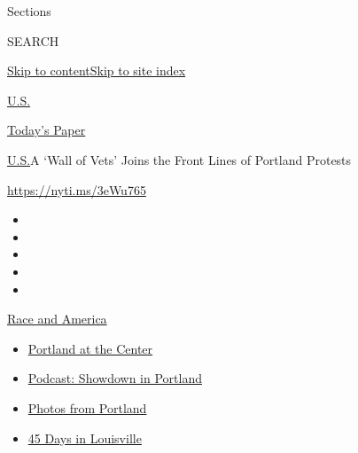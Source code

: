 Sections

SEARCH

\protect\hyperlink{site-content}{Skip to
content}\protect\hyperlink{site-index}{Skip to site index}

\href{https://www.nytimes3xbfgragh.onion/section/us}{U.S.}

\href{https://myaccount.nytimes3xbfgragh.onion/auth/login?response_type=cookie\&client_id=vi}{}

\href{https://www.nytimes3xbfgragh.onion/section/todayspaper}{Today's
Paper}

\href{/section/us}{U.S.}\textbar{}A `Wall of Vets' Joins the Front Lines
of Portland Protests

\url{https://nyti.ms/3eWu765}

\begin{itemize}
\item
\item
\item
\item
\item
\end{itemize}

\href{https://www.nytimes3xbfgragh.onion/news-event/george-floyd-protests-minneapolis-new-york-los-angeles?action=click\&pgtype=Article\&state=default\&module=styln-george-floyd\&region=TOP_BANNER\&context=storylines_menu}{Race
and America}

\begin{itemize}
\tightlist
\item
  \href{https://www.nytimes3xbfgragh.onion/2020/07/24/us/portland-oregon-protests-white-race.html?action=click\&pgtype=Article\&state=default\&module=styln-george-floyd\&region=TOP_BANNER\&context=storylines_menu}{Portland
  at the Center}
\item
  \href{https://www.nytimes3xbfgragh.onion/2020/07/23/podcasts/the-daily/portland-protests.html?action=click\&pgtype=Article\&state=default\&module=styln-george-floyd\&region=TOP_BANNER\&context=storylines_menu}{Podcast:
  Showdown in Portland}
\item
  \href{https://www.nytimes3xbfgragh.onion/2020/07/21/us/portland-photos-protests.html?action=click\&pgtype=Article\&state=default\&module=styln-george-floyd\&region=TOP_BANNER\&context=storylines_menu}{Photos
  from Portland}
\item
  \href{https://www.nytimes3xbfgragh.onion/interactive/2020/07/16/us/black-lives-matter-protests-louisville-breonna-taylor.html?action=click\&pgtype=Article\&state=default\&module=styln-george-floyd\&region=TOP_BANNER\&context=storylines_menu}{45
  Days in Louisville}
\end{itemize}


